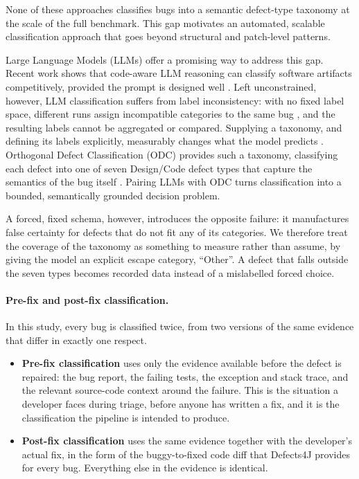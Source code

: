 \documentclass{iutbscthesis}
\begin{document}
None of these approaches classifies bugs into a semantic defect-type taxonomy at the scale of the full benchmark. This gap motivates an automated, scalable classification approach that goes beyond structural and patch-level patterns.

Large Language Models (LLMs) offer a promising way to address this gap. Recent work shows that code-aware LLM reasoning can classify software artifacts competitively, provided the prompt is designed well \cite{colavito2024llm, koyuncu2025exploring, nong2024cot}. Left unconstrained, however, LLM classification suffers from label inconsistency: with no fixed label space, different runs assign incompatible categories to the same bug \cite{koyuncu2025exploring}, and the resulting labels cannot be aggregated or compared. Supplying a taxonomy, and defining its labels explicitly, measurably changes what the model predicts \cite{li2024knowbug}. Orthogonal Defect Classification (ODC) provides such a taxonomy, classifying each defect into one of seven Design/Code defect types that capture the semantics of the bug itself \cite{chillarege1992odc, ibm2013odc}. Pairing LLMs with ODC turns classification into a bounded, semantically grounded decision problem.

A forced, fixed schema, however, introduces the opposite failure: it manufactures false certainty for defects that do not fit any of its categories. We therefore treat the coverage of the taxonomy as something to measure rather than assume, by giving the model an explicit escape category, ``Other''. A defect that falls outside the seven types becomes recorded data instead of a mislabelled forced choice.

\paragraph{Pre-fix and post-fix classification.}
\label{sec:prefix_postfix}
In this study, every bug is classified twice, from two versions of the same evidence that differ in exactly one respect.

\begin{itemize}
    \item \textbf{Pre-fix classification} uses only the evidence available before the defect is repaired: the bug report, the failing tests, the exception and stack trace, and the relevant source-code context around the failure. This is the situation a developer faces during triage, before anyone has written a fix, and it is the classification the pipeline is intended to produce.
    \item \textbf{Post-fix classification} uses the same evidence together with the developer's actual fix, in the form of the buggy-to-fixed code diff that Defects4J provides for every bug. Everything else in the evidence is identical.
\end{itemize}
\end{document}

